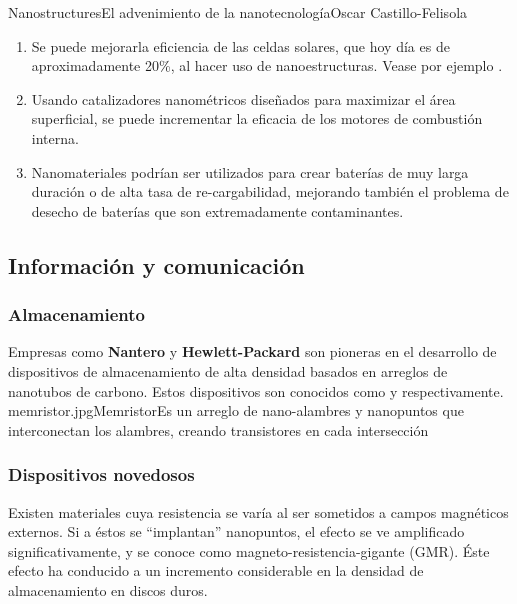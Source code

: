 \begin{article}{Nanostructures}{El advenimiento de la nanotecnolog\'ia}{Oscar Castillo-Felisola}
\begin{enumerate}
\item 
Se puede mejorarla eficiencia de las celdas solares, que hoy d\'ia es de aproximadamente 20\%, al hacer uso de nanoestructuras. Vease por ejemplo .

\item 
Usando catalizadores nanom\'etricos dise\~nados para maximizar el \'area superficial, se puede incrementar la eficacia de los motores de combusti\'on interna.

\item 
Nanomateriales podr\'ian ser utilizados para crear bater\'ias de  muy larga duraci\'on o de alta tasa de re-cargabilidad, mejorando tambi\'en el problema de desecho de bater\'ias que son extremadamente contaminantes.
\end{enumerate}



\subsection{Informaci\'on y comunicaci\'on}
\subsubsection*{Almacenamiento}
Empresas como {\bf Nantero} y {\bf Hewlett-Packard} son pioneras en el desarrollo de dispositivos de almacenamiento de alta densidad basados en arreglos de nanotubos de carbono. Estos dispositivos son conocidos como  y  respectivamente.
\Bild%
    {memristor.jpg}{Memristor}{Es un arreglo de nano-alambres y nanopuntos que interconectan los alambres, creando transistores en cada intersecci\'on}

\subsubsection*{Dispositivos novedosos}

Existen materiales cuya resistencia se var\'ia  al ser sometidos a campos magn\'eticos externos. Si a \'estos se ``implantan'' nanopuntos, el efecto se ve amplificado significativamente, y se conoce como magneto-resistencia-gigante (GMR). \'Este efecto ha conducido a un incremento considerable en la densidad de almacenamiento en discos duros.


\end{article}
